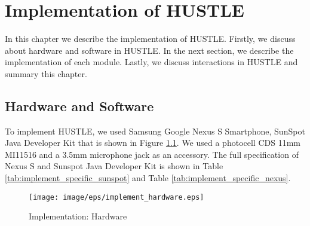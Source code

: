 \chapter{Implementation of HUSTLE}\label{chap:implementation}
In this chapter we describe the implementation of HUSTLE. Firstly, we discuss about hardware and software in HUSTLE. In the next section, we describe the implementation of each module. Lastly, we discuss interactions in HUSTLE and summary this chapter.
\clearpage
\section{Hardware and Software}\label{sec:implementation_hardware}
To implement HUSTLE, we used Samsung Google Nexus S Smartphone, SunSpot Java Developer Kit that is shown in Figure \ref{fig:implement_hardware}. We used a photocell CDS 11mm MI11516 and a 3.5mm microphone jack as an accessory.
The full specification of Nexus S and Sunspot Java Developer Kit is shown in Table \ref{tab:implement_specific_sunspot} and Table \ref{tab:implement_specific_nexus}.

\begin{figure}[tb]
\centering
\texttt{[image: image/eps/implement\_hardware.eps]}
\caption{Implementation: Hardware}
\label{fig:implement_hardware}
\end{figure}

